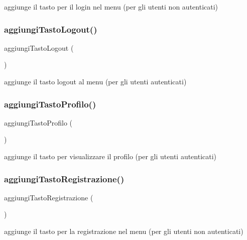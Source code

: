 aggiunge il tasto per il login nel menu (per gli utenti non autenticati) \mbox{\label{class_v_home_ab0039ca5d1d52ecb682381ccf49e3c9d}} 
\subsubsection{\texorpdfstring{aggiungi\+Tasto\+Logout()}{aggiungiTastoLogout()}}
{\footnotesize\ttfamily aggiungi\+Tasto\+Logout (\begin{DoxyParamCaption}{ }\end{DoxyParamCaption})}

aggiunge il tasto logout al menu (per gli utenti autenticati) \mbox{\label{class_v_home_a5944d155e8ff034c8bd1b1b2c50538eb}} 
\subsubsection{\texorpdfstring{aggiungi\+Tasto\+Profilo()}{aggiungiTastoProfilo()}}
{\footnotesize\ttfamily aggiungi\+Tasto\+Profilo (\begin{DoxyParamCaption}{ }\end{DoxyParamCaption})}

aggiunge il tasto per visualizzare il profilo (per gli utenti autenticati) \mbox{\label{class_v_home_aa92baf7c9b82fe4d08c7cbc2328a84c1}} 
\subsubsection{\texorpdfstring{aggiungi\+Tasto\+Registrazione()}{aggiungiTastoRegistrazione()}}
{\footnotesize\ttfamily aggiungi\+Tasto\+Registrazione (\begin{DoxyParamCaption}{ }\end{DoxyParamCaption})}

aggiunge il tasto per la registrazione nel menu (per gli utenti non autenticati) \mbox{\label{class_v_home_a0e650bd9db71247a3bdcc37e1b9cca07}} 
